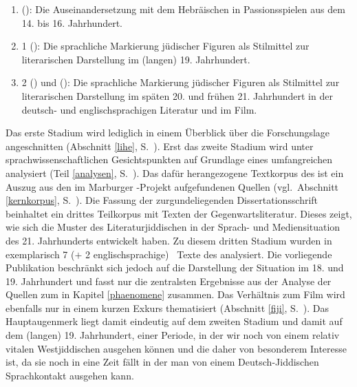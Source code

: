 \begin{enumerate}
\item {} (\hai{{\LiHe}}): Die Auseinandersetzung mit dem Hebräischen in Passionsspielen aus dem 14. bis 16. Jahrhundert. \\
\item {} 1 (): Die sprachliche Markierung jüdischer Figuren als Stilmittel zur literarischen Darstellung %
im (langen) 19. Jahrhundert.\\ %
\item {} 2 (\hai{{\LiJizwei}}) und  (\hai{{\FiJi}}): Die sprachliche Markierung jüdischer Figuren als Stilmittel zur literarischen Darstellung im späten 20. und frühen 21. Jahrhundert in der deutsch- und englischsprachigen Literatur und im Film.\\ %
 \end{enumerate}
   
\noindent  Das erste Stadium wird lediglich in einem Überblick über die Forschungslage angeschnitten (Abschnitt \ref{lihe}, S.\, \pageref{lihe}). Erst das zweite Stadium wird unter sprachwissenschaftlichen Gesichtspunkten auf Grundlage eines umfangreichen  analysiert (Teil \ref{analysen}, S.\, \pageref{analysen}). Das dafür herangezogene Textkorpus des \hai{{\LiJieins}} ist ein Auszug aus den im Marburger -Projekt aufgefundenen Quellen (vgl.\, Abschnitt \ref{kernkorpus}, S.\, \pageref{kernkorpus}). Die Fassung der zurgundeliegenden Dissertationsschrift beinhaltet ein drittes Teilkorpus mit Texten der Gegenwartsliteratur. Dieses zeigt, wie sich die Muster des Literaturjiddischen in der Sprach- und Mediensituation des 21. Jahrhunderts entwickelt haben. Zu diesem dritten Stadium wurden in \textcite{SchaeferDiss} exemplarisch 7 ($+$ 2 englischsprachige) \,%
  Texte des \hai{{\LiJizwei}} analysiert. Die vorliegende Publikation beschränkt sich jedoch auf die Darstellung der Situation im 18. und 19. Jahrhundert und fasst nur die zentralsten Ergebnisse aus der Analyse der Quellen zum \hai{{\LiJizwei}} in Kapitel \ref{phaenomene} zusammen.  Das Verhältnis zum Film wird ebenfalls nur in einem kurzen Exkurs thematisiert (Abschnitt \ref{fiji}, S.\, \pageref{fiji}). Das Hauptaugenmerk liegt damit eindeutig auf dem zweiten Stadium und damit auf dem (langen) 19. Jahrhundert, einer Periode, in der wir noch von einem relativ vitalen Westjiddischen ausgehen können und die daher von besonderem Interesse ist, da sie noch in eine Zeit fällt in der man von einem Deutsch-Jiddischen Sprachkontakt ausgehen kann.
 


